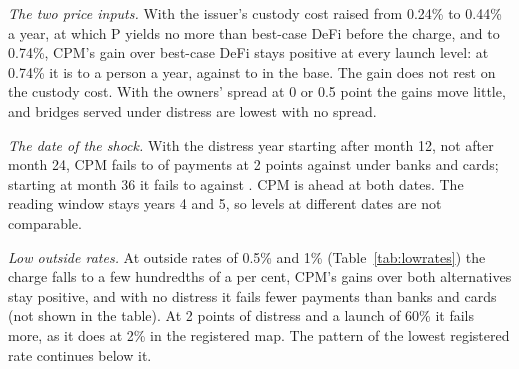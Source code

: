 \emph{The two price inputs.} With the issuer's custody cost raised from 0.24\% to 0.44\% a year, at which P yields
no more than best-case DeFi before the charge, and to 0.74\%, CPM's gain over best-case DeFi stays positive at
every launch level: at 0.74\% it is \ExploreCustodyDefiLow{} to \ExploreCustodyDefiHigh{} a person a year, against
\ExploreBaseDefiLow{} to \ExploreBaseDefiHigh{} in the base. The gain does not rest on the custody cost. With the
owners' spread at 0 or 0.5 point the gains move little, and bridges served under distress are lowest with no
spread.

\emph{The date of the shock.} With the distress year starting after month 12, not after month 24, CPM fails
\ExploreShockEarlyFailLow{} to \ExploreShockEarlyFailHigh{} of payments at 2 points against
\ExploreShockEarlyBanksHigh{} under banks and cards; starting at month 36 it fails \ExploreShockLateFailLow{} to
\ExploreShockLateFailHigh{} against \ExploreShockLateBanksHigh{}. CPM is ahead at both dates. The reading window
stays years 4 and 5, so levels at different dates are not comparable.

\emph{Low outside rates.} At outside rates of 0.5\% and 1\% (Table~\ref{tab:lowrates}) the charge falls to a few
hundredths of a per cent, CPM's gains over both alternatives stay positive, and with no distress it fails fewer
payments than banks and cards (not shown in the table). At 2 points of distress and a launch of 60\% it fails more, as it does at 2\% in
the registered map. The pattern of the lowest registered rate continues below it.

\begin{table}[htbp]\centering\small
\resizebox{\linewidth}{!}{}
\caption{Exploratory side checks on \ExploreSeeds{} seeds, six cells at an outside rate of 4.4\%, one setting
changed in each: CPM's gain in money, in dollars a person a year with no distress, and bridges served in years 4
and 5 at 2 points of distress.}
\label{tab:explore}
\end{table}

\begin{table}[htbp]\centering\small
\resizebox{\linewidth}{!}{}
\caption{The pool's fixed cost at its sourced level and at multiples of it, with no distress, by launch
participation: the price of a bridge, participation in years 4 and 5 and CPM's gain over banks and cards in
dollars a person a year. Exploratory, \ExploreSeeds{} seeds.}
\label{tab:spiral}
\end{table}

